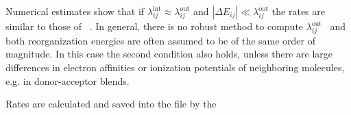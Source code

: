 Numerical estimates show that if  $\lambda_{ij}^\text{int} \approx \lambda_{ij}^\text{out}$ and $|\Delta E_{ij}| \ll \lambda_{ij}^\text{out}$ the rates are similar to those of ~. In general, there is no robust method to compute $\lambda_{ij}^\text{out}$~\cite{hoffman_reorganization_1996} and  both reorganization energies are often assumed to be of the same order of magnitude. In this case the second condition also holds, unless there are large differences in electron affinities or ionization potentials of neighboring molecules, e.g. in donor-acceptor blends.

Rates are calculated and saved into the \sqlstate file by the  \calculator

{\noindent \small \ctprun \opt \xmloptions  \seg  \xmlsegments \sql  \sqlstate \exe  {} }
\vskip 0.2cm
